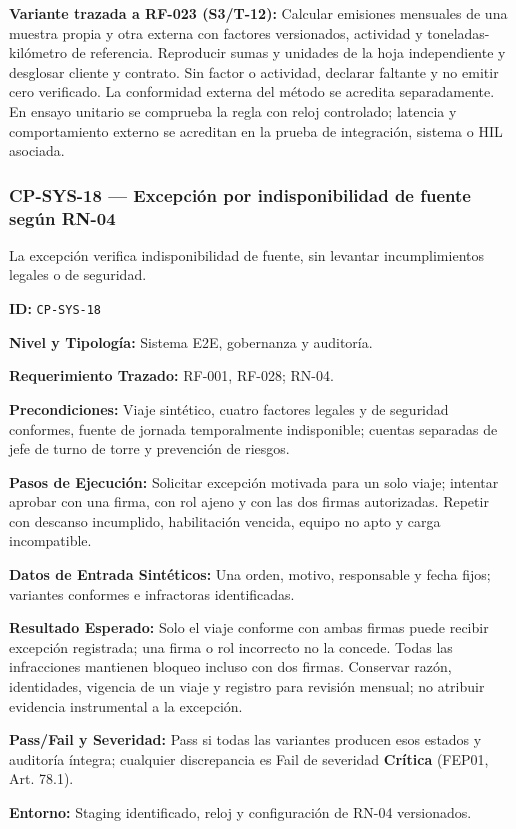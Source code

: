 \par\noindent\textbf{Variante trazada a RF-023 (S3/T-12):} Calcular emisiones mensuales de una muestra propia y otra externa con factores versionados, actividad y toneladas-kilómetro de referencia. Reproducir sumas y unidades de la hoja independiente y desglosar cliente y contrato. Sin factor o actividad, declarar faltante y no emitir cero verificado. La conformidad externa del método se acredita separadamente. En ensayo unitario se comprueba la regla con reloj controlado; latencia y comportamiento externo se acreditan en la prueba de integración, sistema o HIL asociada.\par
\subsubsection*{CP-SYS-18 — Excepción por indisponibilidad de fuente según RN-04}\label{sec:9-cp-sys-18}
La excepción verifica indisponibilidad de fuente, sin levantar incumplimientos legales o de seguridad.
\par\noindent \textbf{ID:} \texttt{CP-\allowbreak{}SYS-\allowbreak{}18}\par
\par\noindent \textbf{Nivel y Tipología:} Sistema E2E, gobernanza y auditoría.\par
\par\noindent \textbf{Requerimiento Trazado:} RF-001, RF-028; RN-04.\par
\par\noindent \textbf{Precondiciones:} Viaje sintético, cuatro factores legales y de seguridad conformes, fuente de jornada temporalmente indisponible; cuentas separadas de jefe de turno de torre y prevención de riesgos.\par
\par\noindent \textbf{Pasos de Ejecución:} Solicitar excepción motivada para un solo viaje; intentar aprobar con una firma, con rol ajeno y con las dos firmas autorizadas. Repetir con descanso incumplido, habilitación vencida, equipo no apto y carga incompatible.\par
\par\noindent \textbf{Datos de Entrada Sintéticos:} Una orden, motivo, responsable y fecha fijos; variantes conformes e infractoras identificadas.\par
\par\noindent \textbf{Resultado Esperado:} Solo el viaje conforme con ambas firmas puede recibir excepción registrada; una firma o rol incorrecto no la concede. Todas las infracciones mantienen bloqueo incluso con dos firmas. Conservar razón, identidades, vigencia de un viaje y registro para revisión mensual; no atribuir evidencia instrumental a la excepción.\par
\par\noindent \textbf{Pass/Fail y Severidad:} Pass si todas las variantes producen esos estados y auditoría íntegra; cualquier discrepancia es Fail de severidad \textbf{Crítica} (FEP01, Art. 78.1).\par
\par\noindent \textbf{Entorno:} Staging identificado, reloj y configuración de RN-04 versionados.\par


